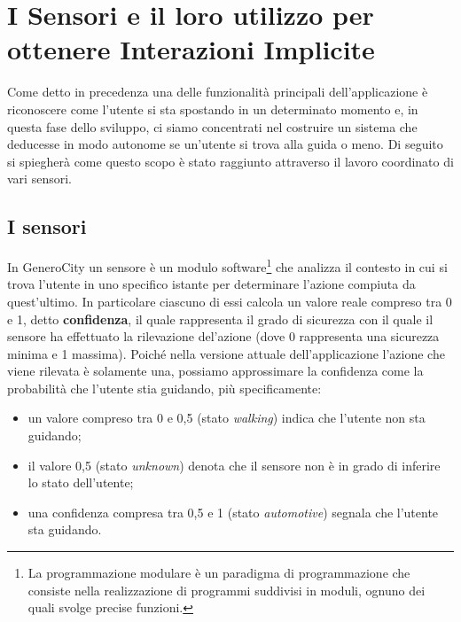 \chapter{I Sensori e il loro utilizzo per ottenere Interazioni Implicite}

Come detto in precedenza una delle funzionalità principali dell'applicazione è riconoscere come l'utente si sta spostando in un determinato momento e, in questa fase dello sviluppo, ci siamo concentrati nel costruire un sistema che deducesse in modo autonome se un'utente si trova alla guida o meno. Di seguito si spiegherà come questo scopo è stato raggiunto attraverso il lavoro coordinato di vari sensori.


\section{I sensori}
In GeneroCity un sensore è un modulo software\footnote{La programmazione modulare è un paradigma di programmazione che consiste nella realizzazione di programmi suddivisi in moduli, ognuno dei quali svolge precise funzioni.} che analizza il contesto in cui si trova l'utente in uno specifico istante per determinare l'azione compiuta da quest'ultimo. In particolare ciascuno di essi calcola un valore reale compreso tra 0 e 1, detto \textbf{confidenza}, il quale rappresenta il grado di sicurezza con il quale il sensore ha effettuato la rilevazione del'azione (dove 0 rappresenta una sicurezza minima e 1 massima). Poiché nella versione attuale dell'applicazione l'azione che viene rilevata è solamente una, possiamo approssimare la confidenza come la probabilità che l'utente stia guidando, più specificamente:
\begin{itemize}
    \item un valore compreso tra 0 e 0,5 (stato \textit{walking}) indica che l'utente non sta guidando;
    \item il valore 0,5 (stato \textit{unknown}) denota che il sensore non è in grado di inferire lo stato dell'utente;
    \item una confidenza compresa tra 0,5 e 1 (stato \textit{automotive}) segnala che l'utente sta guidando.
\end{itemize}

